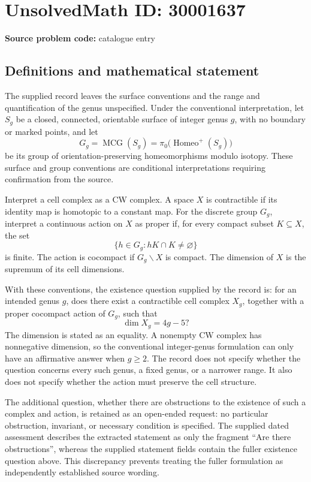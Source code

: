 \documentclass[11pt]{article}
\begin{document}
\section*{UnsolvedMath ID: 30001637}
\textbf{Source problem code:} catalogue entry
\subsection{Definitions and mathematical statement}
The supplied record leaves the surface conventions and the range and quantification of the genus unspecified. Under the conventional interpretation, let \(S_g\) be a closed, connected, orientable surface of integer genus \(g\), with no boundary or marked points, and let
\[
G_g=\operatorname{MCG}(S_g)
=\pi_0\bigl(\operatorname{Homeo}^{+}(S_g)\bigr)
\]
be its group of orientation-preserving homeomorphisms modulo isotopy. These surface and group conventions are conditional interpretations requiring confirmation from the source.

Interpret a cell complex as a CW complex. A space \(X\) is contractible if its identity map is homotopic to a constant map. For the discrete group \(G_g\), interpret a continuous action on \(X\) as proper if, for every compact subset \(K\subseteq X\), the set
\[
\{h\in G_g:hK\cap K\ne\varnothing\}
\]
is finite. The action is cocompact if \(G_g\backslash X\) is compact. The dimension of \(X\) is the supremum of its cell dimensions.

With these conventions, the existence question supplied by the record is: for an intended genus \(g\), does there exist a contractible cell complex \(X_g\), together with a proper cocompact action of \(G_g\), such that
\[
\dim X_g=4g-5?
\]
The dimension is stated as an equality. A nonempty CW complex has nonnegative dimension, so the conventional integer-genus formulation can only have an affirmative answer when \(g\ge 2\). The record does not specify whether the question concerns every such genus, a fixed genus, or a narrower range. It also does not specify whether the action must preserve the cell structure.

The additional question, whether there are obstructions to the existence of such a complex and action, is retained as an open-ended request: no particular obstruction, invariant, or necessary condition is specified. The supplied dated assessment describes the extracted statement as only the fragment ``Are there obstructions'', whereas the supplied statement fields contain the fuller existence question above. This discrepancy prevents treating the fuller formulation as independently established source wording.
\end{document}
